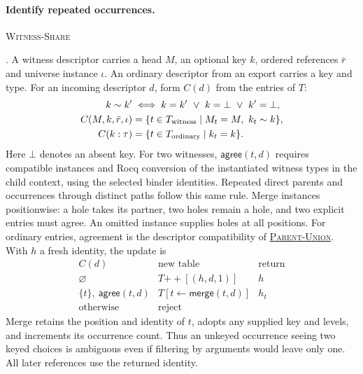 \documentclass{article}
\newcommand{\rdefn}[1]{\hypertarget{rule-#1}{\textsc{#1}}}
\newcommand{\ruse}[1]{\hyperlink{rule-#1}{\textsc{#1}}}
\begin{document}
\paragraph{Identify repeated occurrences.}
\rdefn{Witness-Share}. A witness descriptor carries a head $M$, an
optional key $k$, ordered references $\bar r$ and universe instance
$\iota$. An ordinary descriptor from an export carries a key and type.
For an incoming descriptor $d$, form $C(d)$ from the entries of $T$:
\[
\begin{aligned}
  k\sim k' &\iff k=k'\ \lor\ k=\bot\ \lor\ k'=\bot,\\
 C(M,k,\bar r,\iota)
   &=\{t\in T_{\rm witness}\mid M_t=M,\ k_t\sim k\},\\
 C(k:\tau)&=\{t\in T_{\rm ordinary}\mid k_t=k\}.
\end{aligned}
\]
Here $\bot$ denotes an absent key. For two witnesses,
$\mathsf{agree}(t,d)$ requires compatible instances and Rocq conversion
of the instantiated witness types in the child context, using the
selected binder identities. Repeated direct parents and occurrences
through distinct paths follow this same rule. Merge instances positionwise: a hole takes its
partner, two holes remain a hole, and two explicit entries must agree.
An omitted instance supplies holes at all positions. For ordinary
entries, agreement is the descriptor compatibility of \ruse{Parent-Union}.
With $h$ a fresh identity, the update is
\[
\begin{array}{lll}
 C(d) & \text{new table} & \text{return}\\ \hline
 \varnothing & T\mathbin{+\!\!+}[(h,d,1)] & h\\
 \{t\},\ \mathsf{agree}(t,d)
     & T[t\gets\mathsf{merge}(t,d)] & h_t\\
 \text{otherwise} & \text{reject} &
\end{array}
\]
Merge retains the position and identity of $t$, adopts any supplied
key and levels, and increments its occurrence count. Thus an unkeyed
occurrence seeing two keyed choices is ambiguous even if filtering by
arguments would leave only one. All later references use the returned
identity.
\end{document}
